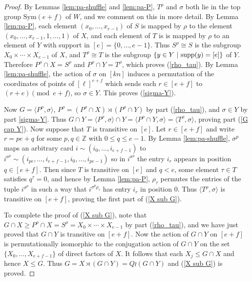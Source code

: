 \documentclass[12pt]{amsart}
\theoremstyle{remark}
\theoremstyle{definition}
\newcommand{\sym}{\mathrm{Sym}}
\begin{document}
\begin{proof}
By Lemmas \ref{lem:pa-shuffle} and \ref{lem:pa-P}, $T^\rho$ and $\sigma$ both lie in the top group $\sym(e+f)$ of $W$, and we comment on this in more detail. By Lemma \ref{lem:pa-P}, each element $(x_0, \dots, x_{e-1})$ of $S$ is mapped by $\rho$ to the element $(x_0, \dots, x_{e-1}, 1, \dots, 1)$ of $X$, and each element of $T$ is  is mapped by $\rho$ to an element of $Y$ with support in $[e] = \{0, \dots, e-1\}$. Thus $S^\rho\cong S$ is the subgroup $X_0 \times \cdots \times X_{e-1}$ of $X$, and $T^\rho\cong T$ is the subgroup $\{ y \in Y \ | \ \textnormal{supp}(y) = [e] \}$ of $Y$. Therefore $P^\rho \cap X = S^\rho$ and $P^\rho \cap Y = T^\rho$, which proves (\ref{rho_tau}). By Lemma \ref{lem:pa-shuffle}, the action of $\sigma$ on $[kn]$ induces a permutation of the coordinates of points of $[\ell]^{e+f}$ which sends each $r \in [e+f]$ to $(r+e) \pmod{e+f}$, so $\sigma \in Y$. This proves (\ref{sigma-Y}).

Now $G = \langle P^\rho, \sigma \rangle$, $P^\rho = (P^\rho\cap X)\rtimes (P^\rho\cap Y)$ by part (\ref{rho_tau}),  and $\sigma\in Y$ by part \eqref{sigma-Y}. Thus $G \cap Y = \langle P^\rho, \sigma \rangle \cap Y = \langle P^\rho \cap Y, \sigma \rangle = \langle T^\rho, \sigma \rangle$, 
proving part (\ref{G cap Y}). Now suppose that $T$ is transitive on $[e]$. Let $r \in [e+f]$ and write $r = pe + q$ for some $p, q \in \mathbb{Z}$ with $0 \leqslant q \leqslant e-1$. By Lemma \ref{lem:pa-shuffle}, $\sigma^{p}$ maps an arbitrary card $i \sim (i_0, \ldots, i_{e+f-1})$ to $i^{\sigma^{p}} \sim (i_{pe}, \ldots, i_{e+f-1}, i_0, \ldots, i_{pe-1})$ so in $i^{\sigma^{p}}$ the entry $i_r$ appears in position $q \in [e+f]$. Then since $T$ is transitive on $[e]$ and $q<e$, some element $\tau \in T$ satisfies $q^\tau = 0$, and hence by Lemma \ref{lem:pa-P}, $\rho_\tau$ permutes the entries of the tuple $i^{\sigma^{p}}$ in such a way that $i^{\sigma^{p}\rho_\tau}$ has entry $i_r$ in position $0$. Thus $\langle T^\rho, \sigma \rangle$ is transitive on $[e+f]$, proving the first part of (\ref{X sub G}).


To complete the proof of (\ref{X sub G}), note that $G \cap X \geqslant P^\rho \cap X = S^\rho = X_0 \times \cdots \times X_{e-1}$ by part (\ref{rho_tau}), and we have just proved that $G \cap Y$ is transitive on $[e+f]$. Now the action of $G \cap Y$ on $[e+f]$ is permutationally isomorphic to the conjugation action of $G \cap Y$ on the set $\{X_0, \ldots, X_{e+f-1}\}$ of direct factors of $X$. It follows that each $X_j \leqslant G \cap X$ and hence $X \leqslant G$. Thus $G = X \rtimes (G \cap Y) = Q \wr (G \cap Y)$ and (\ref{X sub G}) is proved.


\end{proof}
\end{document}
